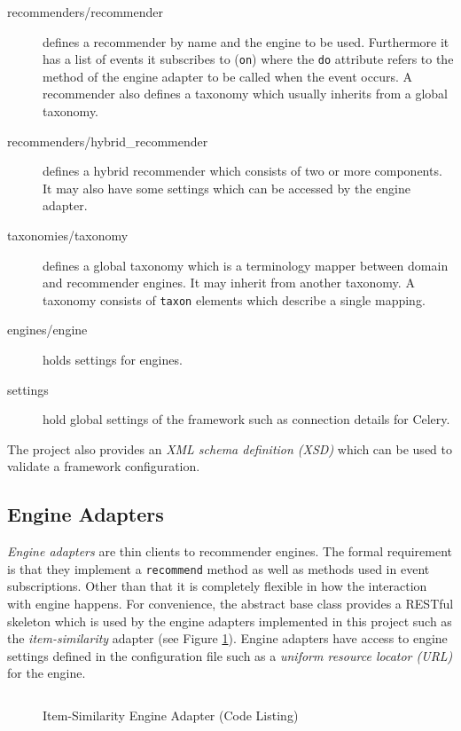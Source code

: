 \begin{description}
    \item[recommenders/recommender] defines a recommender by name and the engine to be used. Furthermore it has a list of events it subscribes to (\texttt{on}) where the \texttt{do} attribute refers to the method of the engine adapter to be called when the event occurs. A recommender also defines a taxonomy which usually inherits from a global taxonomy.
    \item[recommenders/hybrid_recommender] defines a hybrid recommender which consists of two or more components. It may also have some settings which can be accessed by the engine adapter.
    \item[taxonomies/taxonomy] defines a global taxonomy which is a terminology mapper between domain and recommender engines. It may inherit from another taxonomy. A taxonomy consists of \texttt{taxon} elements which describe a single mapping.
    \item[engines/engine] holds settings for engines.
    \item[settings] hold global settings of the framework such as connection details for Celery.
\end{description}

The project also provides an \emph{XML schema definition (XSD)} which can be used to validate a framework configuration.

\subsection{Engine Adapters}
\label{implementation-framework-engine-adapter}

\emph{Engine adapters} are thin clients to recommender engines. The formal requirement is that they implement a \texttt{recommend} method as well as methods used in event subscriptions. Other than that it is completely flexible in how the interaction with engine happens. For convenience, the abstract base class provides a RESTful skeleton which is used by the engine adapters implemented in this project such as the \emph{item-similarity} adapter (see Figure \ref{fig:implementation-framework-engine-adapter}). Engine adapters have access to engine settings defined in the configuration file such as a \emph{uniform resource locator (URL)} for the engine.

\begin{figure}[!ht]
    \inputminted{py}{./includes/source/framework/engines/item\string_similarity.py}
    \caption{Item-Similarity Engine Adapter (Code Listing)}
    \label{fig:implementation-framework-engine-adapter}
\end{figure}

